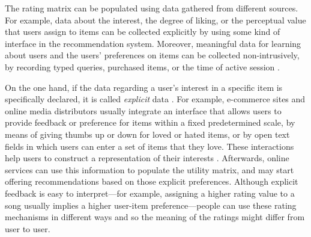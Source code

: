 The rating matrix can be populated using data gathered from different sources. 
For example, data about the interest, the degree of liking, or the perceptual value that users assign to items can be collected explicitly by using some kind of interface in the recommendation system. 
Moreover, meaningful data for learning about users and the users' preferences on items can be collected non-intrusively, by recording typed queries, purchased items, or the time of active session \autocite{pazzani07content}.

On the one hand, if the data regarding a user's interest in a specific item is specifically declared, it is called \textit{explicit} data \autocite{hu08collaborative}. For example, e-commerce sites and online media distributors usually integrate an interface that allows users to provide feedback or preference for items within a fixed predetermined scale, by means of giving thumbs up or down for loved or hated items, or by open text fields in which users can enter a set of items that they love. These interactions help users to construct a representation of their interests \autocite{adomavicius05toward}. 
Afterwards, online services can use this information to populate the utility matrix, and may start offering recommendations based on those explicit preferences.
Although explicit feedback is easy to interpret---for example, assigning a higher rating value to a song usually implies a higher user-item preference---people can use these rating mechanisms in different ways and so the meaning of the ratings might differ from user to user. 


